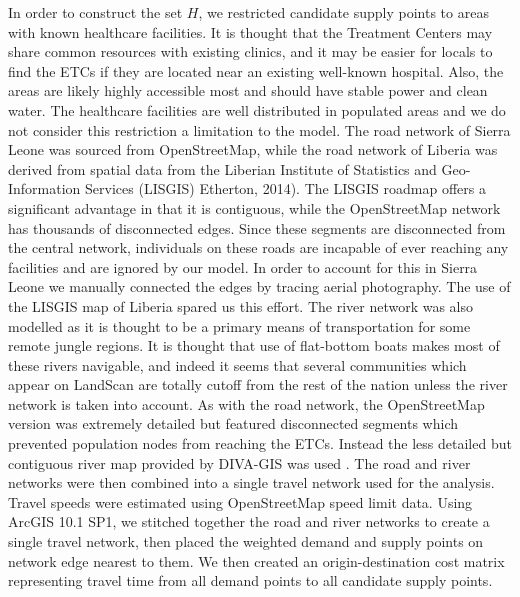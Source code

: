 In order to construct the set $H$,
we restricted candidate supply points to areas with known healthcare facilities. 
It is thought that the Treatment Centers may share common resources with existing clinics, and it may be easier for locals to find the ETCs if they are located near an existing well-known hospital. Also, the areas are likely highly accessible most and should have stable power and clean water. The healthcare facilities are well distributed in populated areas and we do not consider this restriction a limitation to the model. 
The road network of Sierra Leone was sourced from OpenStreetMap,
while the road network of Liberia was derived from spatial data from the Liberian Institute of Statistics and Geo-Information Services (LISGIS) Etherton, 2014). The LISGIS roadmap offers a significant advantage in that it is contiguous, while the OpenStreetMap network has thousands of disconnected edges. Since these segments are disconnected from the central network, individuals on these roads are incapable of ever reaching any facilities and are ignored by our model. In order to account for this in Sierra Leone we manually connected the edges by tracing aerial photography. The use of the LISGIS map of Liberia spared us this effort. The river network was also modelled as it is thought to be a primary means of transportation for some remote jungle regions. It is thought that use of flat-bottom boats makes most of these rivers navigable, and indeed it seems that several communities which appear on LandScan are totally cutoff from the rest of the nation unless the river network is taken into account. As with the road network, the OpenStreetMap version was extremely detailed but featured disconnected segments which prevented population nodes from reaching the ETCs. Instead the less detailed but contiguous river map provided by DIVA-GIS was used \cite{DIVA}. The road and river networks were then combined into a single travel network used for the analysis. Travel speeds were estimated using OpenStreetMap speed limit data. 
Using ArcGIS 10.1 SP1, we stitched together the road and river networks to create a single travel network, then placed the weighted demand and supply points on network edge nearest to them. We then created an origin-destination cost matrix representing travel time from all demand points to all candidate supply points.


